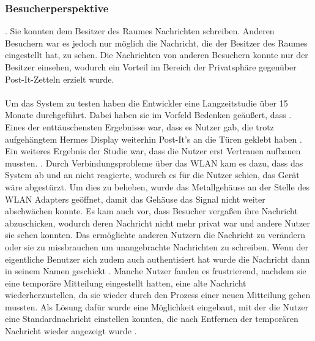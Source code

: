 \subsubsection{Besucherperspektive}
. Sie konnten dem Besitzer des Raumes Nachrichten schreiben. Anderen Besuchern war es jedoch nur möglich die Nachricht, die der Besitzer des Raumes eingestellt hat, zu sehen. Die Nachrichten von anderen Besuchern konnte nur der Besitzer einsehen, wodurch ein Vorteil im Bereich der Privatsphäre gegenüber Post-It-Zetteln erzielt wurde.
\\
\\
Um das System zu testen haben die Entwickler eine Langzeitstudie über 15 Monate durchgeführt. Dabei haben sie im Vorfeld Bedenken geäußert, dass .
Eines der enttäuschensten Ergebnisse war, dass es Nutzer gab, die trotz aufgehängtem Hermes Display weiterhin Post-It's an die Türen geklebt haben \cite{cheverest:2003:paper}.
Ein weiteres Ergebnis der Studie war, dass die Nutzer erst Vertrauen aufbauen mussten. . Durch Verbindungsprobleme über das WLAN kam es dazu, dass das System ab und an nicht reagierte, wodurch es für die Nutzer schien, das Gerät wäre abgestürzt. Um dies zu beheben, wurde das Metallgehäuse an der Stelle des WLAN Adapters geöffnet, damit das Gehäuse das Signal nicht weiter abschwächen konnte.
Es kam auch vor, dass Besucher vergaßen ihre Nachricht abzuschicken, wodurch deren Nachricht nicht mehr privat war und andere Nutzer sie sehen konnten. Das ermöglichte anderen Nutzern die Nachricht zu verändern oder sie zu missbrauchen um unangebrachte Nachrichten zu schreiben. Wenn der eigentliche Benutzer sich zudem auch authentisiert hat wurde die Nachricht dann in seinem Namen geschickt \cite{cheverest:2003:article}.
Manche Nutzer fanden es frustrierend, nachdem sie eine temporäre Mitteilung eingestellt hatten, eine alte Nachricht wiederherzustellen, da sie wieder durch den Prozess einer neuen Mitteilung gehen mussten. Als Lösung dafür wurde eine Möglichkeit eingebaut, mit der die Nutzer eine Standardnachricht einstellen konnten, die nach Entfernen der temporären Nachricht wieder angezeigt wurde \cite{cheverest:2003:article}.
\\
